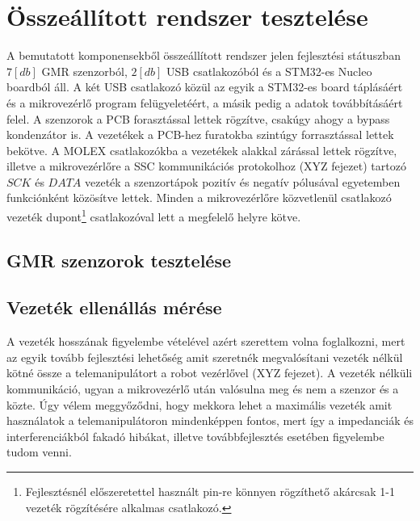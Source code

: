 \section{Összeállított rendszer tesztelése}

A bemutatott komponensekből összeállított rendszer jelen fejlesztési státuszban $7[db]$ GMR szenzorból, $2[db]$ USB csatlakozóból és a STM32-es Nucleo boardból áll. A két USB csatlakozó közül az egyik a STM32-es board táplásáért és a mikrovezérlő program felügyeletéért, a másik pedig a adatok továbbításáért felel. A szenzorok a PCB forasztással lettek rögzítve, csakúgy ahogy a bypass kondenzátor is. A vezetékek a PCB-hez furatokba szintúgy forrasztással lettek bekötve. A MOLEX csatlakozókba a vezetékek alakkal zárással lettek rögzítve, illetve a mikrovezérlőre a SSC kommunikációs protokolhoz (XYZ fejezet) tartozó $SCK$ és $DATA$ vezeték a szenzortápok pozitív és negatív pólusával egyetemben funkciónként közösítve lettek. Minden a mikrovezérlőre közvetlenül csatlakozó vezeték dupont\footnote{Fejlesztésnél előszeretettel használt pin-re könnyen rögzíthető akárcsak 1-1 vezeték rögzítésére alkalmas csatlakozó.} csatlakozóval lett a megfelelő helyre kötve.


\subsection{GMR szenzorok tesztelése}


\subsection{Vezeték ellenállás mérése}

A vezeték hosszának figyelembe vételével azért szerettem volna foglalkozni, mert az egyik tovább fejlesztési lehetőség amit szeretnék megvalósítani vezeték nélkül kötné össze a telemanipulátort a robot vezérlővel (XYZ fejezet). A vezeték nélküli kommunikáció, ugyan a mikrovezérlő után valósulna meg és nem a szenzor és a közte. Úgy vélem meggyőződni, hogy mekkora lehet a maximális vezeték amit használatok a telemanipulátoron mindenképpen fontos, mert így a impedanciák és interferenciákból fakadó hibákat, illetve továbbfejlesztés esetében figyelembe tudom venni.


